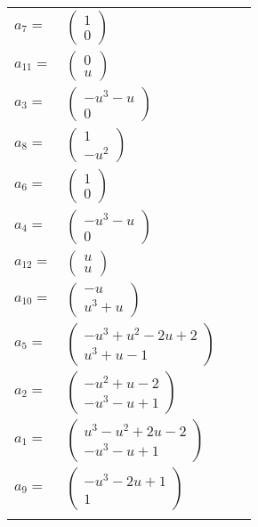 \documentclass[1p]{elsarticle_modified}
\theoremstyle{definition}
\begin{document}
\begin{tabular}{m{7pt} m{180pt} m{7pt} m{180pt} }
\flushright $a_{7}=$&$\begin{pmatrix}1\\0\end{pmatrix}$ \\
\flushright $a_{11}=$&$\begin{pmatrix}0\\u\end{pmatrix}$ \\
\flushright $a_{3}=$&$\begin{pmatrix}- u^3- u\\0\end{pmatrix}$ \\
\flushright $a_{8}=$&$\begin{pmatrix}1\\- u^2\end{pmatrix}$ \\
\flushright $a_{6}=$&$\begin{pmatrix}1\\0\end{pmatrix}$ \\
\flushright $a_{4}=$&$\begin{pmatrix}- u^3- u\\0\end{pmatrix}$ \\
\flushright $a_{12}=$&$\begin{pmatrix}u\\u\end{pmatrix}$ \\
\flushright $a_{10}=$&$\begin{pmatrix}- u\\u^3+u\end{pmatrix}$ \\
\flushright $a_{5}=$&$\begin{pmatrix}- u^3+u^2-2 u+2\\u^3+u-1\end{pmatrix}$ \\
\flushright $a_{2}=$&$\begin{pmatrix}- u^2+u-2\\- u^3- u+1\end{pmatrix}$ \\
\flushright $a_{1}=$&$\begin{pmatrix}u^3- u^2+2 u-2\\- u^3- u+1\end{pmatrix}$ \\
\flushright $a_{9}=$&$\begin{pmatrix}- u^3-2 u+1\\1\end{pmatrix}$\\&\end{tabular}
\end{document}
